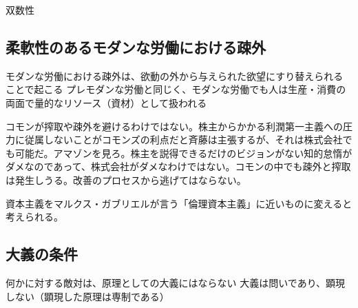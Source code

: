 双数性

\subsection{柔軟性のあるモダンな労働における疎外}\label{ux67d4ux8edfux6027ux306eux3042ux308bux30e2ux30c0ux30f3ux306aux52b4ux50cdux306bux304aux3051ux308bux758eux5916}

モダンな労働における疎外は、欲動の外から与えられた欲望にすり替えられることで起こる
プレモダンな労働と同じく、モダンな労働でも人は生産・消費の両面で量的なリソース（資材）として扱われる

コモンが搾取や疎外を避けるわけではない。株主からかかる利潤第一主義への圧力に従属しないことがコモンズの利点だと斉藤は主張するが、それは株式会社でも可能だ。アマゾンを見ろ。株主を説得できるだけのビジョンがない知的怠惰がダメなのであって、株式会社がダメなわけではない。コモンの中でも疎外と搾取は発生しうる。改善のプロセスから逃げてはならない。

資本主義をマルクス・ガブリエルが言う「倫理資本主義」に近いものに変えると考えられる。

\subsection{大義の条件}\label{ux5927ux7fa9ux306eux6761ux4ef6}

何かに対する敵対は、原理としての大義にはならない
大義は問いであり、顕現しない（顕現した原理は専制である）
